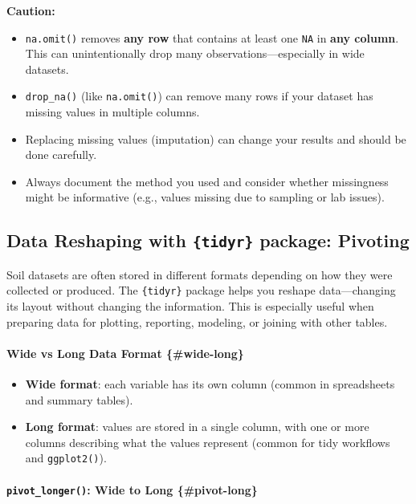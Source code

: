 \documentclass[
  10pt,
  b5paper,
  oneside]{book}
\begin{document}
\textbf{Caution:}

\begin{itemize}
\item
  \texttt{na.omit()} removes \textbf{any row} that contains at least one \texttt{NA} in \textbf{any column}. This can unintentionally drop many observations---especially in wide datasets.
\item
  \texttt{drop\_na()} (like \texttt{na.omit()}) can remove many rows if your dataset has missing values in multiple columns.
\item
  Replacing missing values (imputation) can change your results and should be done carefully.
\item
  Always document the method you used and consider whether missingness might be informative (e.g., values missing due to sampling or lab issues).
\end{itemize}

\subsection{\texorpdfstring{Data Reshaping with \texttt{\{tidyr\}} package: Pivoting}{Data Reshaping with \{tidyr\} package: Pivoting}}\label{pivoting}

Soil datasets are often stored in different formats depending on how they were collected or produced. The \texttt{\{tidyr\}} package helps you reshape data---changing its layout without changing the information. This is especially useful when preparing data for plotting, reporting, modeling, or joining with other tables.

\paragraph*{Wide vs Long Data Format \{\#wide-long\}}\label{wide-vs-long-data-format-wide-long}

\begin{itemize}
\item
  \textbf{Wide format}: each variable has its own column (common in spreadsheets and summary tables).
\item
  \textbf{Long format}: values are stored in a single column, with one or more columns describing what the values represent (common for tidy workflows and \texttt{ggplot2()}).
\end{itemize}

\paragraph*{\texorpdfstring{\texttt{pivot\_longer()}: Wide to Long \{\#pivot-long\}}{pivot\_longer(): Wide to Long \{\#pivot-long\}}}\label{pivot_longer-wide-to-long-pivot-long}
\end{document}
